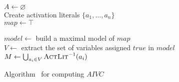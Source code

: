 \begin{algorithm}[t]
  \BlankLine
  $A \leftarrow \varnothing$\\
  Create activation literals $\{a_1, \ldots, a_n\}$ \\
  $map \leftarrow \top$ \\
  \BlankLine

   { \label{alg:aivc:checksat}
    $model \leftarrow $ build a maximal model of $map$  \label{alg:aivc:maxsat} \\
    $V \leftarrow$ extract the set of variables assigned $true$ in $model$ \\
    $M \leftarrow \bigcup_{a_i \in V} \textsc{ActLit} ^{-1}(a_i)$ \\ %
\BlankLine
  }
\caption{Algorithm \aivcalg ~for computing $AIVC$}
\label{alg:aivc}
\end{algorithm}

